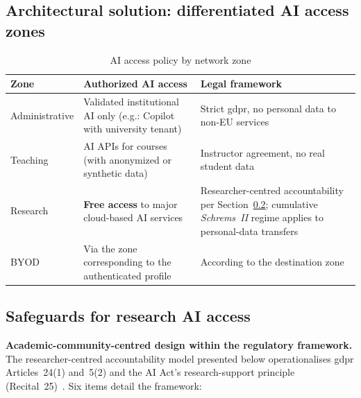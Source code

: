 \subsection{Architectural solution: differentiated AI access zones}

\begin{table}[H]
\centering
\caption{AI access policy by network zone}
\label{tab:ia-zones}
\small
\begin{tabularx}{\textwidth}{l X X}
\toprule
\textbf{Zone} & \textbf{Authorized AI access} &
    \textbf{Legal framework} \\
\midrule
Administrative & Validated institutional AI only (e.g.: Copilot
    with university tenant) & Strict \gls{gdpr}, no personal data
    to non-EU services \\
\addlinespace
Teaching & AI APIs for courses (with anonymized or
    synthetic data) & Instructor agreement, no real student data \\
\addlinespace
Research & \textbf{Free access} to major cloud-based AI services
    & Researcher-centred accountability per
    Section~\ref{sec:safeguards-ai}; cumulative \emph{Schrems~II}
    regime applies to personal-data transfers~\cite{schrems2020} \\
\addlinespace
BYOD & Via the zone corresponding to the authenticated profile &
    According to the destination zone \\
\bottomrule
\end{tabularx}
\end{table}

\subsection{Safeguards for research AI access}
\label{sec:safeguards-ai}

\textbf{Academic-community-centred design within the regulatory
framework.} The researcher-centred accountability model presented
below operationalises \gls{gdpr} Articles~24(1) and~5(2) and the
AI Act's research-support principle (Recital~25)~\cite{eu-ai-act}.
Six items detail the framework:

